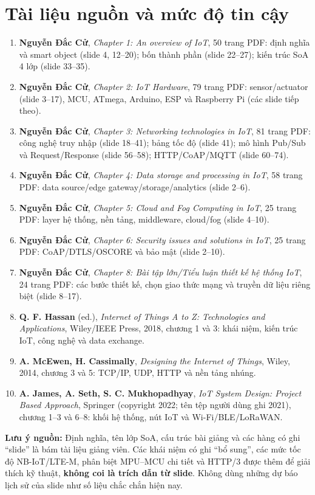 \documentclass[11pt,a4paper]{article}
\begin{document}
\section{Tài liệu nguồn và mức độ tin cậy}
\begin{enumerate}
\item \textbf{Nguyễn Đắc Cử}, \emph{Chapter 1: An overview of IoT}, 50 trang PDF: định nghĩa và smart object (slide 4, 12--20); bốn thành phần (slide 22--27); kiến trúc SoA 4 lớp (slide 33--35).
\item \textbf{Nguyễn Đắc Cử}, \emph{Chapter 2: IoT Hardware}, 79 trang PDF: sensor/actuator (slide 3--17), MCU, ATmega, Arduino, ESP và Raspberry Pi (các slide tiếp theo).
\item \textbf{Nguyễn Đắc Cử}, \emph{Chapter 3: Networking technologies in IoT}, 81 trang PDF: công nghệ truy nhập (slide 18--41); bảng tốc độ (slide 41); mô hình Pub/Sub và Request/Response (slide 56--58); HTTP/CoAP/MQTT (slide 60--74).
\item \textbf{Nguyễn Đắc Cử}, \emph{Chapter 4: Data storage and processing in IoT}, 58 trang PDF: data source/edge gateway/storage/analytics (slide 2--6).
\item \textbf{Nguyễn Đắc Cử}, \emph{Chapter 5: Cloud and Fog Computing in IoT}, 25 trang PDF: layer hệ thống, nền tảng, middleware, cloud/fog (slide 4--10).
\item \textbf{Nguyễn Đắc Cử}, \emph{Chapter 6: Security issues and solutions in IoT}, 25 trang PDF: CoAP/DTLS/OSCORE và bảo mật (slide 2--10).
\item \textbf{Nguyễn Đắc Cử}, \emph{Chapter 8: Bài tập lớn/Tiểu luận thiết kế hệ thống IoT}, 24 trang PDF: các bước thiết kế, chọn giao thức mạng và truyền dữ liệu riêng biệt (slide 8--17).
\item \textbf{Q. F. Hassan} (ed.), \emph{Internet of Things A to Z: Technologies and Applications}, Wiley/IEEE Press, 2018, chương 1 và 3: khái niệm, kiến trúc IoT, công nghệ và data exchange.
\item \textbf{A. McEwen, H. Cassimally}, \emph{Designing the Internet of Things}, Wiley, 2014, chương 3 và 5: TCP/IP, UDP, HTTP và nền tảng nhúng.
\item \textbf{A. James, A. Seth, S. C. Mukhopadhyay}, \emph{IoT System Design: Project Based Approach}, Springer (copyright 2022; tên tệp người dùng ghi 2021), chương 1--3 và 6--8: khối hệ thống, nút IoT và Wi-Fi/BLE/LoRaWAN.
\end{enumerate}
\textbf{Lưu ý nguồn:} Định nghĩa, tên lớp SoA, cấu trúc bài giảng và các hàng có ghi ``slide'' là bám tài liệu giảng viên. Các khái niệm có ghi ``bổ sung'', các mức tốc độ NB-IoT/LTE-M, phân biệt MPU--MCU chi tiết và HTTP/3 được thêm để giải thích kỹ thuật, \textbf{không coi là trích dẫn từ slide}. Không dùng những dự báo lịch sử của slide như số liệu chắc chắn hiện nay.
\end{document}
